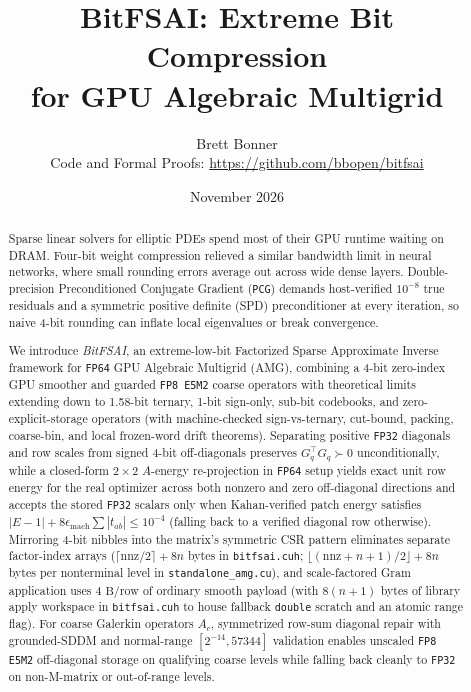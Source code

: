 \documentclass[10pt]{article}
\title{\textbf{BitFSAI: Extreme Bit Compression\\
for GPU Algebraic Multigrid}}
\author{Brett Bonner\\
\small Code and Formal Proofs: \url{https://github.com/bbopen/bitfsai}}
\date{November 2026}
\begin{document}
\maketitle

\begin{abstract}
Sparse linear solvers for elliptic PDEs spend most of their GPU runtime waiting on DRAM. Four-bit weight compression relieved a similar bandwidth limit in neural networks, where small rounding errors average out across wide dense layers. Double-precision Preconditioned Conjugate Gradient (\texttt{PCG}) demands host-verified $10^{-8}$ true residuals and a symmetric positive definite (SPD) preconditioner at every iteration, so naive 4-bit rounding can inflate local eigenvalues or break convergence.

We introduce \emph{BitFSAI}, an extreme-low-bit Factorized Sparse Approximate Inverse framework for \texttt{FP64} GPU Algebraic Multigrid (AMG), combining a 4-bit zero-index GPU smoother and guarded \texttt{FP8 E5M2} coarse operators with theoretical limits extending down to 1.58-bit ternary, 1-bit sign-only, sub-bit codebooks, and zero-explicit-storage operators (with machine-checked sign-vs-ternary, cut-bound, packing, coarse-bin, and local frozen-word drift theorems). Separating positive \texttt{FP32} diagonals and row scales from signed 4-bit off-diagonals preserves $G_q^\top G_q \succ 0$ unconditionally, while a closed-form $2\times 2$ $A$-energy re-projection in \texttt{FP64} setup yields exact unit row energy for the real optimizer across both nonzero and zero off-diagonal directions and accepts the stored \texttt{FP32} scalars only when Kahan-verified patch energy satisfies $|E - 1| + 8 \epsilon_{\mathrm{mach}} \sum |t_{ab}| \le 10^{-4}$ (falling back to a verified diagonal row otherwise). Mirroring 4-bit nibbles into the matrix's symmetric CSR pattern eliminates separate factor-index arrays ($\lceil\mathrm{nnz}/2\rceil + 8n$ bytes in \texttt{bitfsai.cuh}; $\lfloor(\mathrm{nnz} + n + 1)/2\rfloor + 8n$ bytes per nonterminal level in \texttt{standalone\_amg.cu}), and scale-factored Gram application uses $4\text{ B/row}$ of ordinary smooth payload (with $8(n+1)$ bytes of library apply workspace in \texttt{bitfsai.cuh} to house fallback \texttt{double} scratch and an atomic range flag). For coarse Galerkin operators $A_c$, symmetrized row-sum diagonal repair with grounded-SDDM and normal-range $[2^{-14}, 57344]$ validation enables unscaled \texttt{FP8 E5M2} off-diagonal storage on qualifying coarse levels while falling back cleanly to \texttt{FP32} on non-M-matrix or out-of-range levels.


\end{abstract}
\end{document}
